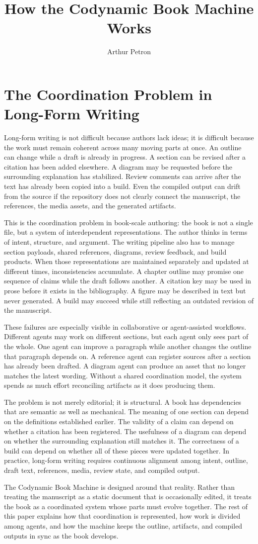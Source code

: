 \documentclass[11pt]{article}
\title{How the Codynamic Book Machine Works}
\author{Arthur Petron}
\begin{document}
\section*{The Coordination Problem in Long-Form Writing}

Long-form writing is not difficult because authors lack ideas; it is difficult because the work must remain coherent across many moving parts at once. An outline can change while a draft is already in progress. A section can be revised after a citation has been added elsewhere. A diagram may be requested before the surrounding explanation has stabilized. Review comments can arrive after the text has already been copied into a build. Even the compiled output can drift from the source if the repository does not clearly connect the manuscript, the references, the media assets, and the generated artifacts.

This is the coordination problem in book-scale authoring: the book is not a single file, but a system of interdependent representations. The author thinks in terms of intent, structure, and argument. The writing pipeline also has to manage section payloads, shared references, diagrams, review feedback, and build products. When those representations are maintained separately and updated at different times, inconsistencies accumulate. A chapter outline may promise one sequence of claims while the draft follows another. A citation key may be used in prose before it exists in the bibliography. A figure may be described in text but never generated. A build may succeed while still reflecting an outdated revision of the manuscript.

These failures are especially visible in collaborative or agent-assisted workflows. Different agents may work on different sections, but each agent only sees part of the whole. One agent can improve a paragraph while another changes the outline that paragraph depends on. A reference agent can register sources after a section has already been drafted. A diagram agent can produce an asset that no longer matches the latest wording. Without a shared coordination model, the system spends as much effort reconciling artifacts as it does producing them.

The problem is not merely editorial; it is structural. A book has dependencies that are semantic as well as mechanical. The meaning of one section can depend on the definitions established earlier. The validity of a claim can depend on whether a citation has been registered. The usefulness of a diagram can depend on whether the surrounding explanation still matches it. The correctness of a build can depend on whether all of these pieces were updated together. In practice, long-form writing requires continuous alignment among intent, outline, draft text, references, media, review state, and compiled output.

The Codynamic Book Machine is designed around that reality. Rather than treating the manuscript as a static document that is occasionally edited, it treats the book as a coordinated system whose parts must evolve together. The rest of this paper explains how that coordination is represented, how work is divided among agents, and how the machine keeps the outline, artifacts, and compiled outputs in sync as the book develops.
\end{document}
